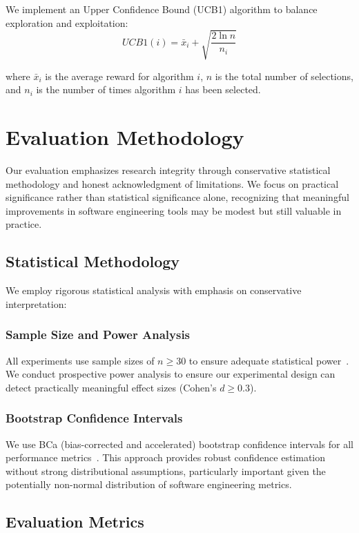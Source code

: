 \documentclass[conference]{IEEEtran}
\begin{document}
We implement an Upper Confidence Bound (UCB1) algorithm to balance exploration and exploitation:
\begin{equation}
UCB1(i) = \bar{x}_i + \sqrt{\frac{2 \ln n}{n_i}}
\end{equation}

where $\bar{x}_i$ is the average reward for algorithm $i$, $n$ is the total number of selections, and $n_i$ is the number of times algorithm $i$ has been selected.

\section{Evaluation Methodology}

Our evaluation emphasizes research integrity through conservative statistical methodology and honest acknowledgment of limitations. We focus on practical significance rather than statistical significance alone, recognizing that meaningful improvements in software engineering tools may be modest but still valuable in practice.

\subsection{Statistical Methodology}

We employ rigorous statistical analysis with emphasis on conservative interpretation:

\subsubsection{Sample Size and Power Analysis}
All experiments use sample sizes of $n \geq 30$ to ensure adequate statistical power~\cite{cohen1988statistical}. We conduct prospective power analysis to ensure our experimental design can detect practically meaningful effect sizes (Cohen's $d \geq 0.3$).

\subsubsection{Bootstrap Confidence Intervals}
We use BCa (bias-corrected and accelerated) bootstrap confidence intervals for all performance metrics~\cite{efron1987better}. This approach provides robust confidence estimation without strong distributional assumptions, particularly important given the potentially non-normal distribution of software engineering metrics.

\subsection{Evaluation Metrics}
\end{document}
